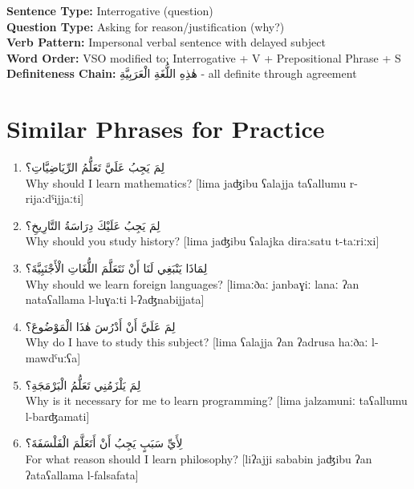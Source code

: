 \documentclass[letterpaper,12pt]{article}
\begin{document}
\begin{tcolorbox}[colback=white,colframe=accentcolor,breakable,title=\textbf{Syntactic Analysis}]
\textbf{Sentence Type:} Interrogative (question)\\
\textbf{Question Type:} Asking for reason/justification (why?)\\
\textbf{Verb Pattern:} Impersonal verbal sentence with delayed subject\\
\textbf{Word Order:} VSO modified to: Interrogative + V + Prepositional Phrase + S\\
\textbf{Definiteness Chain:} \textarabic{هٰذِهِ اللُّغَةِ الْعَرَبِيَّةِ} - all definite through agreement
\end{tcolorbox}

\section{Similar Phrases for Practice}

\begin{enumerate}
\item \textarabic{لِمَ يَجِبُ عَلَيَّ تَعَلُّمُ الرِّيَاضِيَّاتِ؟}\\
Why should I learn mathematics? [lima jaʤibu ʕalajja taʕallumu r-rijaːdˤijjaːti]

\item \textarabic{لِمَ يَجِبُ عَلَيْكَ دِرَاسَةُ التَّارِيخِ؟}\\
Why should you study history? [lima jaʤibu ʕalajka diraːsatu t-taːriːxi]

\item \textarabic{لِمَاذَا يَنْبَغِي لَنَا أَنْ نَتَعَلَّمَ اللُّغَاتِ الْأَجْنَبِيَّةَ؟}\\
Why should we learn foreign languages? [limaːðaː janbaɣiː lanaː ʔan nataʕallama l-luɣaːti l-ʔaʤnabijjata]

\item \textarabic{لِمَ عَلَيَّ أَنْ أَدْرُسَ هٰذَا الْمَوْضُوعَ؟}\\
Why do I have to study this subject? [lima ʕalajja ʔan ʔadrusa haːðaː l-mawdˤuːʕa]

\item \textarabic{لِمَ يَلْزَمُنِي تَعَلُّمُ الْبَرْمَجَةِ؟}\\
Why is it necessary for me to learn programming? [lima jalzamuniː taʕallumu l-barʤamati]

\item \textarabic{لِأَيِّ سَبَبٍ يَجِبُ أَنْ أَتَعَلَّمَ الْفَلْسَفَةَ؟}\\
For what reason should I learn philosophy? [liʔajji sababin jaʤibu ʔan ʔataʕallama l-falsafata]
\end{enumerate}
\end{document}
